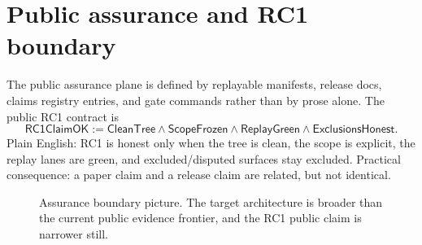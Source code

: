 \documentclass[10pt]{extarticle}
\begin{document}
\section{Public assurance and RC1 boundary}
The public assurance plane is defined by replayable manifests, release docs,
claims registry entries, and gate commands rather than by prose alone. The
public RC1 contract is
\[
\mathsf{RC1ClaimOK} := \mathsf{CleanTree} \wedge \mathsf{ScopeFrozen} \wedge \mathsf{ReplayGreen} \wedge \mathsf{ExclusionsHonest}.
\]
Plain English: RC1 is honest only when the tree is clean, the scope is
explicit, the replay lanes are green, and excluded/disputed surfaces stay
excluded.
Practical consequence: a paper claim and a release claim are related, but not
identical.

\begin{figure}[t]
\centering
{}
\caption{Assurance boundary picture. The target architecture is broader than the current public evidence frontier, and the RC1 public claim is narrower still.}
\label{fig:boundary}
\end{figure}
\end{document}

